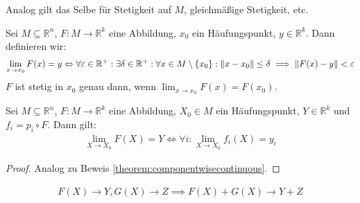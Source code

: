 \documentclass{report}
\renewcommand\epsilon{\varepsilon}
\newcommand{\bR}{\mathbb{R}}
\begin{document}
Analog gilt das Selbe für Stetigkeit auf $M$, gleichmäßige Stetigkeit, etc.
\begin{definition}
 Sei $M \subseteq \bR^n$, $F : M \to \bR^k$ eine Abbildung, $x_0$ ein Häufungspunkt, $y \in \bR^k$. Dann definieren wir:
 \begin{align*}
  \lim_{x \to x_0} F(x) = y \Leftrightarrow \forall \epsilon \in \bR^+ : \exists \delta \in \bR^+ : \forall x \in M \setminus \{x_0\} : \norm{x - x_0} \leq \delta \implies \norm{F(x) - y} < \epsilon
 \end{align*}
 $F$ ist stetig in $x_0$ genau dann, wenn $\lim_{x \to x_0} F(x) = F(x_0)$.
\end{definition}
\begin{theorem}
 Sei $M \subseteq \bR^n$, $F : M \to \bR^k$ eine Abbildung, $X_0 \in M$ ein Häufungspunkt, $Y \in \bR^k$ und $f_i = p_i \circ F$. Dann gilt:
 \begin{align*}
  \lim_{X \to X_0} F(X) = Y \Leftrightarrow \forall i : \lim_{X \to X_0} f_i(X) = y_i
 \end{align*}
\end{theorem}
\begin{proof}
 Analog zu Beweis \ref{theorem:componentwisecontinuous}.
\end{proof}
\begin{corollary}
 \begin{align*}
  F(X) \to Y, G(X) \to Z \implies F(X) + G(X) \to Y + Z
 \end{align*}
\end{corollary}
\end{document}

